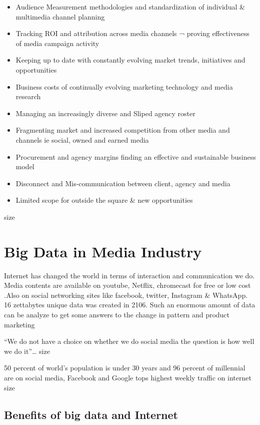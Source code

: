 \documentclass[sigconf]{acmart}
\begin{document}
\begin{itemize}
\item Audience Measurement methodologies and standardization of individual & multimedia channel planning
\item Tracking ROI and attribution across media channels ¬ proving effectiveness of media campaign activity
\item Keeping up to date with constantly evolving market trends, initiatives and opportunities
\item Business costs of continually evolving marketing technology and media research
\item Managing an increasingly diverse and Sliped agency roster
\item Fragmenting market and increased competition from other media and channels ie social, owned and earned media
\item Procurement and agency margins  finding an effective and sustainable business model
\item Disconnect and Mis-communication between client, agency and media
\item Limited scope for outside the square & new opportunities
\end{itemize}
size \cite{Failures}

\section{Big Data in Media Industry}

Internet has changed the world in terms of interaction and communication we do. Media contents are available on youtube, Netflix, chromecast for free or low cost .Also on social networking sites like facebook, twitter, Instagram & WhatsApp.
16 zettabytes unique data was created in 2106. Such an enormous amount of data can be analyze to get some answers to the change in pattern and product marketing

“We do not have a choice on whether we do social media the question is how well we do it”…
                    size \cite{Quote}
										
50 percent of world’s population is under 30 years and 96 percent of millennial are on social media, Facebook and Google tops highest weekly traffic on internet
size \cite{Stats}

\subsection{Benefits of big data and Internet}
\end{document}
